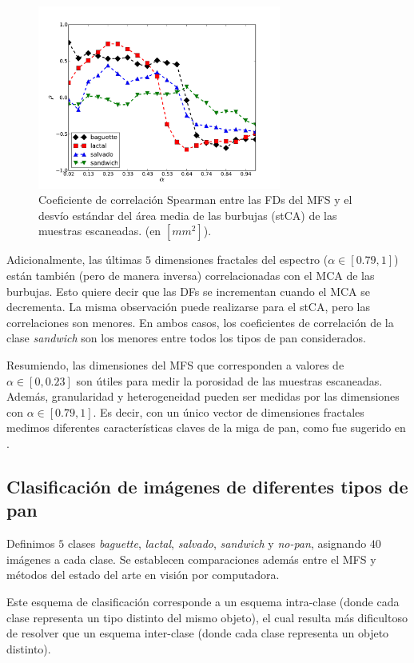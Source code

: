 \begin{figure}[h!]
\centering
\includegraphics[width=8cm]{figures/stMCA}
\caption{Coeficiente de correlación Spearman entre las FDs del MFS y el desvío estándar del área media de las burbujas (stCA) de las muestras escaneadas. (en $[mm^{2}]$).}
\label{fig:corrMCAstdev}
\end{figure}

Adicionalmente, las últimas $5$ dimensiones fractales  del espectro ($\alpha \in [0.79,1]$) están también (pero de manera inversa) correlacionadas con el MCA de las burbujas.
Esto quiere decir que las DFs se incrementan cuando el MCA se decrementa.
La misma observación puede realizarse para el stCA, pero las correlaciones son menores.
En ambos casos, los coeficientes de correlación de la clase {\em sandwich} son los menores entre todos los tipos de pan considerados.

Resumiendo, las dimensiones del MFS que corresponden a valores de  $\alpha \in [0,0.23]$ son útiles para medir la porosidad de las muestras escaneadas. Además, granularidad y heterogeneidad pueden ser medidas por las dimensiones con  $\alpha \in [0.79,1]$.
Es decir, con un único vector de dimensiones fractales medimos diferentes características claves de la miga de pan, como fue sugerido en \cite{Gonzales2008}.

\subsection{Clasificaci\'on de imágenes de diferentes tipos de pan}

Definimos $5$ clases {\em baguette}, {\em lactal}, {\em salvado}, {\em sandwich} y {\em no-pan}, asignando $40$ imágenes a cada clase.  Se establecen comparaciones además entre el MFS y métodos del estado del arte en visión por computadora.

Este esquema de clasificación corresponde a un esquema intra-clase (donde cada clase representa un tipo distinto del mismo objeto), el cual resulta más dificultoso de resolver que un esquema inter-clase (donde cada clase representa un objeto distinto).

